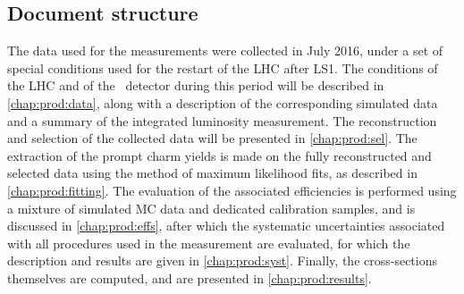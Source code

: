 \subsection{Document structure}
\label{chap:prod:introduction:structure}

The data used for the measurements were collected in July 2016, under a set of 
special conditions used for the restart of the \ac{LHC} after \ac{LS1}.
The conditions of the \ac{LHC} and of the \lhcb\ detector during this period 
will be described in \cref{chap:prod:data}, along with a description of the 
corresponding simulated data and a summary of the integrated luminosity 
measurement.
The reconstruction and selection of the collected data will be presented in 
\cref{chap:prod:sel}.
The extraction of the prompt charm yields is made on the fully reconstructed 
and selected data using the method of maximum likelihood fits, as described in 
\cref{chap:prod:fitting}.
The evaluation of the associated efficiencies is performed using a mixture of 
simulated \acl{MC} data and dedicated calibration samples, and is discussed in 
\cref{chap:prod:effs}, after which the systematic uncertainties associated with 
all procedures used in the measurement are evaluated, for which the description 
and results are given in \cref{chap:prod:syst}.
Finally, the cross-sections themselves are computed, and are presented in 
\cref{chap:prod:results}.
